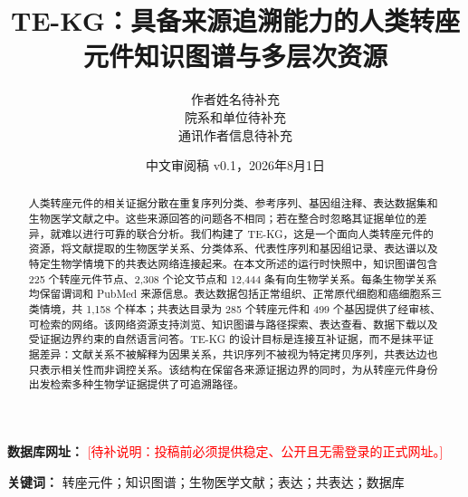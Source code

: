 \documentclass{article}
\title{TE-KG：具备来源追溯能力的人类转座元件知识图谱与多层次资源}
\author{作者姓名待补充\\院系和单位待补充\\通讯作者信息待补充}
\date{中文审阅稿 v0.1，2026年8月1日}
\newcommand{\draftnote}[1]{\textcolor{red}{[待补说明：#1]}}
\begin{document}
\maketitle

\begin{abstract}
人类转座元件的相关证据分散在重复序列分类、参考序列、基因组注释、表达数据集和生物医学文献之中。这些来源回答的问题各不相同；若在整合时忽略其证据单位的差异，就难以进行可靠的联合分析。我们构建了 TE-KG，这是一个面向人类转座元件的资源，将文献提取的生物医学关系、分类体系、代表性序列和基因组记录、表达谱以及特定生物学情境下的共表达网络连接起来。在本文所述的运行时快照中，知识图谱包含 225 个转座元件节点、2,308 个论文节点和 12,444 条有向生物学关系。每条生物学关系均保留谓词和 PubMed 来源信息。表达数据包括正常组织、正常原代细胞和癌细胞系三类情境，共 1,158 个样本；共表达目录为 285 个转座元件和 499 个基因提供了经审核、可检索的网络。该网络资源支持浏览、知识图谱与路径探索、表达查看、数据下载以及受证据边界约束的自然语言问答。TE-KG 的设计目标是连接互补证据，而不是抹平证据差异：文献关系不被解释为因果关系，共识序列不被视为特定拷贝序列，共表达边也只表示相关性而非调控关系。该结构在保留各来源证据边界的同时，为从转座元件身份出发检索多种生物学证据提供了可追溯路径。
\end{abstract}

\noindent\textbf{数据库网址：} \draftnote{投稿前必须提供稳定、公开且无需登录的正式网址。}

\noindent\textbf{关键词：} 转座元件；知识图谱；生物医学文献；表达；共表达；数据库









\end{document}
